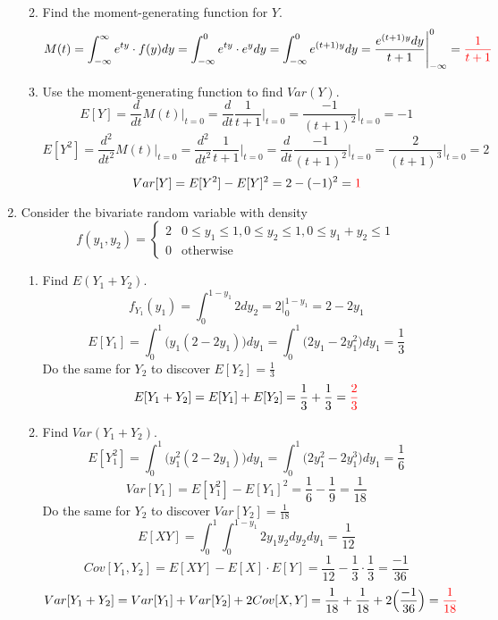 \documentclass{article}
\begin{document}
\begin{enumerate}
\begin{enumerate}
\[        \]
        \item Find the moment-generating function for $Y$.
        \[
            M(t)=\int_{-\infty}^{\infty}e^{ty}\cdot f(y)dy = \int_{-\infty}^{0}e^{ty}\cdot e^y dy = \int_{-\infty}^{0}e^{(t+1)y}dy = \frac{e^{(t+1)y}dy}{t+1}\Bigg|_{-\infty}^{0}=\textcolor{red}{\frac{1}{t+1}}
        \]
        \item Use the moment-generating function to find $Var(Y)$.
        \[
            E[Y] = \frac{d}{dt}M(t)\Big|_{t=0}=\frac{d}{dt}{\frac{1}{t+1}}\Big|_{t=0}={\frac{-1}{(t+1)^2}}\Big|_{t=0} = -1
        \]
        \[
            E[Y^2] = \frac{d^2}{dt^2}M(t)\Big|_{t=0}=\frac{d^2}{dt^2}{\frac{1}{t+1}}\Big|_{t=0}=\frac{d}{dt}{\frac{-1}{(t+1)^2}}\Big|_{t=0} = {\frac{2}{(t+1)^3}}\Big|_{t=0} = 2
        \]
        \[
            Var[Y] = E[Y^2] - E[Y]^2 = 2- (-1)^2 = \textcolor{red}{1}
        \]
    \end{enumerate}
\pagebreak
    \item Consider the bivariate random variable with density
    \[
    f (y_1, y_2) =
    \begin{cases}
    2 & 0 \leq y_1 \leq 1, 0 \leq y_2 \leq 1, 0 \leq y_1 + y_2 \leq 1\\
    0 & \text{otherwise}
    \end{cases}
    \]
    \begin{enumerate}
        \item Find $E(Y_1 + Y_2)$.
    \[
        f_{Y_1}(y_1) = \int_0^{1-y_1} 2 dy_2 = 2\Big|_0^{1-y_1} = 2-2y_1
    \]
    \[
        E[Y_1] = \int_0^1 \big( y_1(2-2y_1) \big) dy_1 = \int_0^1 \big( 2y_1-2y_1^2 \big) dy_1 = \frac{1}{3}
    \]
    Do the same for $Y_2$ to discover $E[Y_2] = \frac{1}{3}$
    \[
        E[Y_1 + Y_2] = E[Y_1] + E[Y_2] = \frac{1}{3} + \frac{1}{3} = \textcolor{red}{\frac{2}{3}}
    \]
    \item Find $Var(Y_1 + Y_2)$.
    \[
        E[Y_1^2] = \int_0^1 \big( y_1^2(2-2y_1) \big) dy_1 = \int_0^1 \big( 2y_1^2-2y_1^3 \big) dy_1 = \frac{1}{6}
    \]
    \[
        Var[Y_1] = E[Y_1^2] - E[Y_1]^2 = \frac{1}{6}-\frac{1}{9} = \frac{1}{18}
    \]
    Do the same for $Y_2$ to discover $Var[Y_2] = \frac{1}{18}$
    \[
        E[XY] = \int_0^1 \int_0^{1-y_1} 2y_1y_2 dy_2dy_1 = \frac{1}{12}
    \]
    \[
        Cov[Y_1,Y_2]=E[XY] - E[X] \cdot E[Y] = \frac{1}{12} - \frac{1}{3} \cdot \frac{1}{3} = \frac{-1}{36}
    \]
    \[
        Var[Y_1+Y_2] = Var[Y_1] + Var[Y_2] + 2Cov[X,Y] = \frac{1}{18} + \frac{1}{18} +2 \Big(\frac{-1}{36}\Big) = \textcolor{red}{\frac{1}{18}}
    \]
    \end{enumerate}

\end{enumerate}
\end{document}
